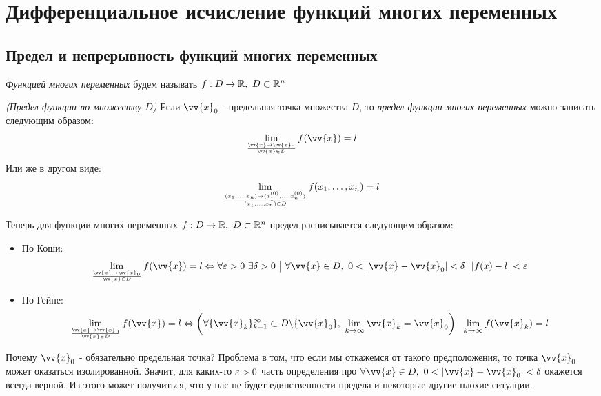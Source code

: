 
\section{Дифференциальное исчисление функций многих переменных}

\subsection{Предел и непрерывность функций многих переменных}

\begin{definition}
	\textit{Функцией многих переменных} будем называть $f: D \to \mathbb{R},\ D \subset \mathbb{R}^n$
\end{definition}

\begin{definition}
	\textit{(Предел функции по множеству $D$)} Если $\vv{x}_0$ - предельная точка множества $D$, то \textit{предел функции многих переменных} можно записать следующим образом:
	\[
		\liml_{\vv{x} \to \vv{x}_0 \over {\vv{x} \in D}} f(\vv{x}) = l
	\]
	Или же в другом виде:
	\[
		\lim\limits_{(x_1, \ldots, x_n) \to (x_1^{(0)}, \ldots, x_n^{(0)}) \over (x_1, \ldots, x_n) \in D} f(x_1, \ldots, x_n) = l
	\]
	
	Теперь для функции многих переменных $f: D \to \mathbb{R},\ D \subset \mathbb{R}^n$ предел расписывается следующим образом:
	\begin{itemize}
		\item По Коши:
		\[
			\liml_{\vv{x} \to \vv{x}_0 \over \vv{x} \in D} f(\vv{x}) = l \Lra \forall \eps > 0\ \exists \delta > 0 \such \forall \vv{x} \in D,\ 0 < |\vv{x} - \vv{x}_0| < \delta\ \ |f(x) - l| < \eps
		\]
		
		\item По Гейне:
		\[
			\liml_{\vv{x} \to \vv{x}_0 \over \vv{x} \in D} f(\vv{x}) = l \Lra \left(\forall \{\vv{x}_k\}_{k = 1}^\infty \subset D \bs \{\vv{x}_0\},\ \liml_{k \to \infty} \vv{x}_k = \vv{x}_0\right)\ \ \liml_{k \to \infty} f(\vv{x}_k) = l
		\]
	\end{itemize}
\end{definition}

\begin{note}
	Почему $\vv{x}_0$ - обязательно предельная точка? Проблема в том, что если мы откажемся от такого предположения, то точка $\vv{x}_0$ может оказаться изолированной. Значит, для каких-то $\varepsilon > 0$ часть определения про $\forall \vv{x} \in D,\ 0 < |\vv{x} - \vv{x}_0| < \delta$ окажется всегда верной. Из этого может получиться, что у нас не будет единственности предела и некоторые другие плохие ситуации.
\end{note}

